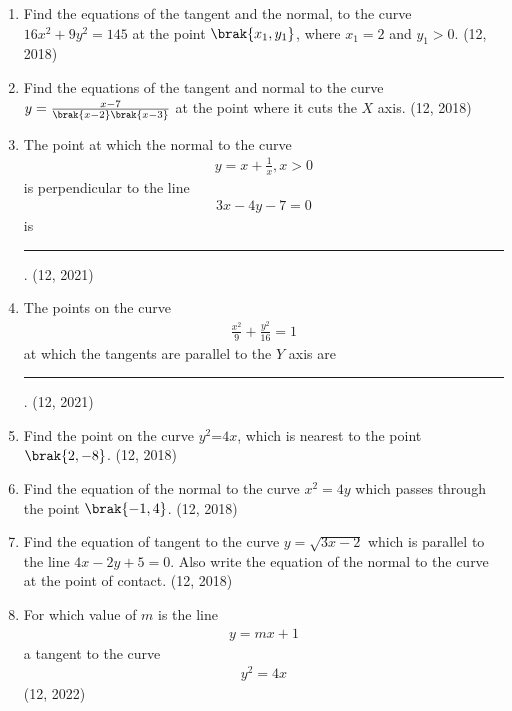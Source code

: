 \begin{enumerate}[label=\thesubsection.\arabic*,ref=\thesubsection.\theenumi]
\item Find the equations of the tangent and the normal, to the curve $16x^{2}+9y^{2}=145$ at the point $\brak{x_1,y_1}$, where $x_1=2$ and $y_1>0$. \hfill (12, 2018)
\item Find the equations of the tangent and normal to the curve $y = \frac{x - 7}{\brak{x - 2}\brak{x - 3}}$ at the point where it cuts the $X$ axis.
\hfill (12, 2018)
\item The point at which the normal to the curve 
\begin{align*}
    y = x+\frac{1}{x}, x>0 
\end{align*}
 is perpendicular to the line
 \begin{align*}
     3x-4y-7 = 0 
 \end{align*}
 is
\rule{1cm}{0.1pt}.
\hfill (12, 2021)
         \item The points on the curve
         \begin{align*}
             \frac{x^2}{9} +\frac{y^2}{16} = 1
         \end{align*}
         at which the tangents are parallel to the $Y$ axis are
\rule{1cm}{0.1pt}.
\hfill (12, 2021)
\item Find the point on the curve $y^2$=$4x$, which is nearest to the point $\brak{2,-8}$.  
\hfill (12, 2018)
\item Find the equation of the normal to the curve ${x}^2 = 4y$ which passes through the point $\brak{-1, 4}$.
\hfill (12, 2018)
\item Find the equation of tangent to the curve $y=\sqrt{3x-2}$ which is parallel to the line $4x-2y+5=0$. Also write the equation of the normal to the curve at the point of contact.
\hfill (12, 2018)
         \item For which value of $m$ is the line
         \begin{align*}
            y = mx + 1 
         \end{align*}a tangent to the curve 
        \begin{align*}
            y^2 = 4x 
        \end{align*}
\hfill (12, 2022)
\end{enumerate} 
